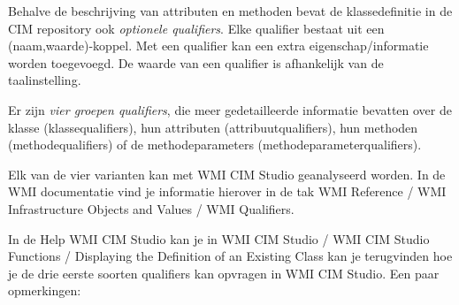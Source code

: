 \documentclass[11pt,a4paper]{report}
\begin{document}
Behalve de beschrijving van attributen en methoden bevat de klassedefinitie in de CIM repository ook \textit{optionele qualifiers}. Elke qualifier bestaat uit een (naam,waarde)-koppel. Met een qualifier kan een extra eigenschap/informatie worden toegevoegd. De waarde van een qualifier is afhankelijk van de taalinstelling.
\par Er zijn \textit{vier groepen qualifiers}, die meer gedetailleerde informatie bevatten over de klasse (klassequalifiers), hun attributen (attribuutqualifiers), hun methoden (methodequalifiers) of de methodeparameters (methodeparameterqualifiers).
\par Elk van de vier varianten kan met WMI CIM Studio geanalyseerd worden. In de WMI documentatie vind je informatie hierover in de tak WMI Reference / WMI Infrastructure Objects and Values / WMI Qualifiers. 
\par In de Help WMI CIM Studio kan je in WMI CIM Studio / WMI CIM Studio Functions / Displaying the Definition of an Existing Class kan je terugvinden hoe je de drie eerste soorten qualifiers kan opvragen in WMI CIM Studio. Een paar opmerkingen:
\end{document}
